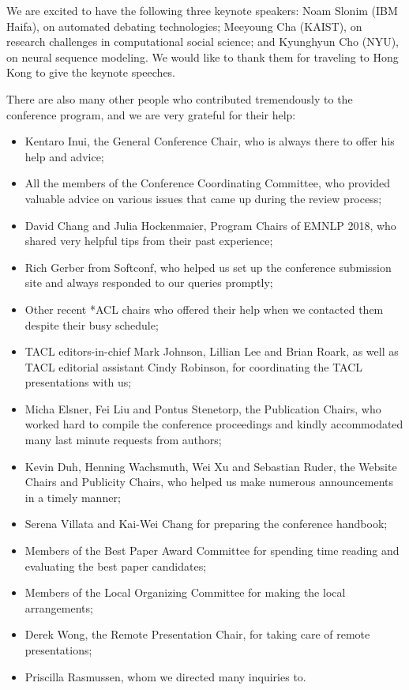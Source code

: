 We are excited to have the following three keynote speakers: Noam Slonim (IBM Haifa), on automated debating technologies; Meeyoung Cha (KAIST), on research challenges in computational social science; and Kyunghyun Cho (NYU), on neural sequence modeling. We would like to thank them for traveling to Hong Kong to give the keynote speeches.

There are also many other people who contributed tremendously to the conference program, and we are very grateful for their help:

\begin{itemize}
   \item Kentaro Inui, the General Conference Chair, who is always there to offer his help and advice;
   \item All the members of the Conference Coordinating Committee, who provided valuable advice on various issues that came up during the review process;
   \item David Chang and Julia Hockenmaier, Program Chairs of EMNLP 2018, who shared very helpful tips from their past experience;
   \item Rich Gerber from Softconf, who helped us set up the conference submission site and always responded to our queries promptly;
   \item Other recent *ACL chairs who offered their help when we contacted them despite their busy schedule;
   \item TACL editors-in-chief Mark Johnson, Lillian Lee and Brian Roark, as well as TACL editorial assistant Cindy Robinson, for coordinating the TACL presentations with us;
   \item Micha Elsner, Fei Liu and Pontus Stenetorp, the Publication Chairs, who worked hard to compile the conference proceedings and kindly accommodated many last minute requests from authors;
   \item Kevin Duh, Henning Wachsmuth, Wei Xu and Sebastian Ruder, the Website Chairs and Publicity Chairs, who helped us make numerous announcements in a timely manner;
   \item Serena Villata and Kai-Wei Chang for preparing the conference handbook;
   \item Members of the Best Paper Award Committee for spending time reading and evaluating the best paper candidates;
   \item Members of the Local Organizing Committee for making the local arrangements;
   \item Derek Wong, the Remote Presentation Chair, for taking care of remote presentations;
   \item Priscilla Rasmussen, whom we directed many inquiries to.
   
\end{itemize}

